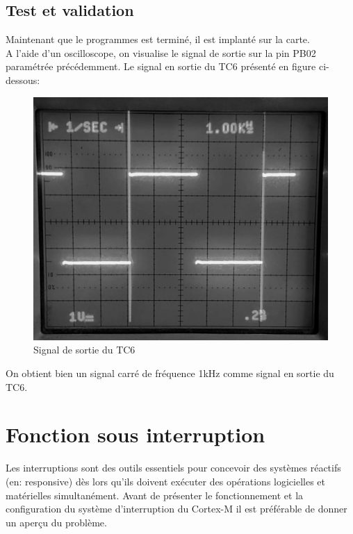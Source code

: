 \documentclass[a4paper]{article}
\begin{document}
	\subsection{Test et validation}
	Maintenant que le programmes est terminé, il est implanté sur la carte.\\
	A l’aide d’un oscilloscope, on visualise le signal de sortie sur la pin PB02 paramétrée précédemment. Le signal en sortie du TC6 présenté en figure ci-dessous:
	\begin{figure}[H]
		\centering
		\includegraphics[width=0.9\linewidth]{chrono_valide_etape2.jpg}
		\caption{Signal de sortie du TC6}
	\end{figure}
	On obtient bien un signal carré de fréquence 1kHz comme signal en sortie du TC6.

	
	\newpage
	
	
	\section{Fonction sous interruption}
	Les interruptions sont des outils essentiels pour concevoir des systèmes réactifs (en: responsive)  dès lors qu'ils doivent exécuter des opérations logicielles et matérielles simultanément. Avant de présenter le fonctionnement et la configuration du système d'interruption du Cortex-M il est préférable de donner un aperçu du problème. \\
\end{document}
